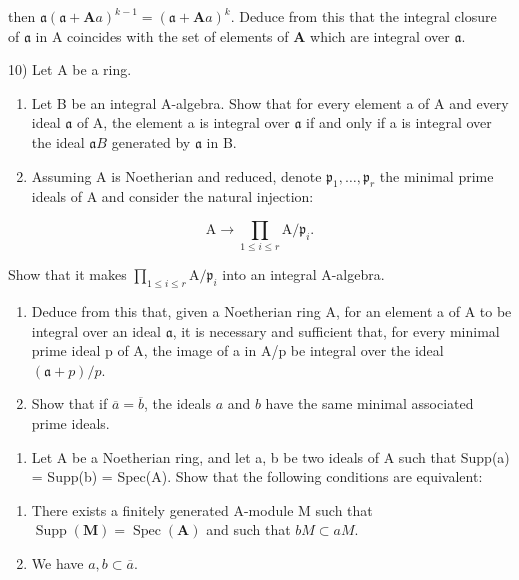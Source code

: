 then \(\mathfrak{a}(\mathfrak{a} + \mathbf{A}a)^{k-1} = (\mathfrak{a} + \mathbf{A}a)^k\). Deduce from this that the integral closure of \(\mathfrak{a}\) in A coincides with the set of elements of \(\mathbf{A}\) which are integral over \(\mathfrak{a}\).

10) Let A be a ring.

\begin{enumerate}
\def\labelenumi{\alph{enumi})}
\item
  Let B be an integral A-algebra. Show that for every element a of A and every ideal \(\mathfrak{a}\) of A, the element a is integral over \(\mathfrak{a}\) if and only if a is integral over the ideal \(\mathfrak{a}B\) generated by \(\mathfrak{a}\) in B.
\item
  Assuming A is Noetherian and reduced, denote \(\mathfrak{p}_{1},\ldots,\mathfrak{p}_{r}\) the minimal prime ideals of A and consider the natural injection:
\end{enumerate}

\[
\mathrm{A} \rightarrow \prod_ {1 \leqslant i \leqslant r} \mathrm{A} / \mathfrak {p} _ {i}.
\]

Show that it makes \(\prod_{1\leqslant i\leqslant r}\mathrm{A} / \mathfrak{p}_i\) into an integral A-algebra.

\begin{enumerate}
\def\labelenumi{\alph{enumi})}
\setcounter{enumi}{2}
\item
  Deduce from this that, given a Noetherian ring A, for an element a of A to be integral over an ideal \(\mathfrak{a}\), it is necessary and sufficient that, for every minimal prime ideal p of A, the image of a in A/p be integral over the ideal \((\mathfrak{a} + p)/p\).
\item
  Show that if \(\overline{a} = \overline{b}\), the ideals \(a\) and \(b\) have the same minimal associated prime ideals.
\end{enumerate}

\begin{enumerate}
\def\labelenumi{\arabic{enumi})}
\setcounter{enumi}{10}
\tightlist
\item
  Let A be a Noetherian ring, and let a, b be two ideals of A such that Supp(a) = Supp(b) = Spec(A). Show that the following conditions are equivalent:
\end{enumerate}

\begin{enumerate}
\def\labelenumi{(\roman{enumi})}
\tightlist
\item
  There exists a finitely generated A-module M such that \(\operatorname{Supp}(\mathbf{M}) = \operatorname{Spec}(\mathbf{A})\) and such that \(bM \subset aM\).\\
\item
  We have \(a, b \subset \overline{a}\).
\end{enumerate}

